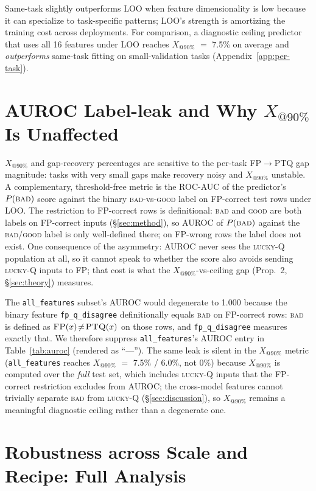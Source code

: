 \documentclass{article}
\makeatletter
\newcommand{\fp}{\textsc{FP}\xspace}
\newcommand{\ptq}{\textsc{PTQ}\xspace}
\newcommand{\good}{\textsc{good}\xspace}
\newcommand{\bad}{\textsc{bad}\xspace}
\newcommand{\luckyq}{\textsc{lucky-Q}\xspace}
\newcommand{\xat}[1]{\ensuremath{X_{@#1\%}}}
\makeatother
\begin{document}
Same-task slightly outperforms LOO when feature dimensionality is low because it can specialize to task-specific patterns; LOO's strength is amortizing the training cost across deployments. For comparison, a diagnostic ceiling predictor that uses all 16 features under LOO reaches \xat{90} $=$ 7.5\% on average and \emph{outperforms} same-task fitting on small-validation tasks (Appendix~\ref{app:per-task}).

\section{AUROC Label-leak and Why \xat{90} Is Unaffected}\label{app:auroc_leak}

\xat{90} and gap-recovery percentages are sensitive to the per-task \fp$\to$\ptq{} gap magnitude: tasks with very small gaps make recovery noisy and \xat{90} unstable. A complementary, threshold-free metric is the ROC-AUC of the predictor's $P(\bad)$ score against the binary \bad{}-vs-\good{} label on FP-correct test rows under LOO. The restriction to FP-correct rows is definitional: \bad{} and \good{} are both labels on FP-correct inputs (\S\ref{sec:method}), so AUROC of $P(\bad)$ against the \bad{}/\good{} label is only well-defined there; on FP-wrong rows the label does not exist. One consequence of the asymmetry: AUROC never sees the \luckyq{} population at all, so it cannot speak to whether the score also avoids sending \luckyq{} inputs to \fp{}; that cost is what the \xat{90}-vs-ceiling gap (Prop.~2, \S\ref{sec:theory}) measures.

The \texttt{all\_features} subset's AUROC would degenerate to 1.000 because the binary feature \texttt{fp\_q\_disagree} definitionally equals \bad{} on FP-correct rows: \bad{} is defined as $\fp(x)\!\neq\!\ptq(x)$ on those rows, and \texttt{fp\_q\_disagree} measures exactly that. We therefore suppress \texttt{all\_features}'s AUROC entry in Table~\ref{tab:auroc} (rendered as ``---''). The same leak is silent in the \xat{90} metric (\texttt{all\_features} reaches \xat{90} $=$ 7.5\% / 6.0\%, not 0\%) because \xat{90} is computed over the \emph{full} test set, which includes \luckyq{} inputs that the FP-correct restriction excludes from AUROC; the cross-model features cannot trivially separate \bad{} from \luckyq{} (\S\ref{sec:discussion}), so \xat{90} remains a meaningful diagnostic ceiling rather than a degenerate one.

\section{Robustness across Scale and Recipe: Full Analysis}\label{app:regime}
\end{document}
